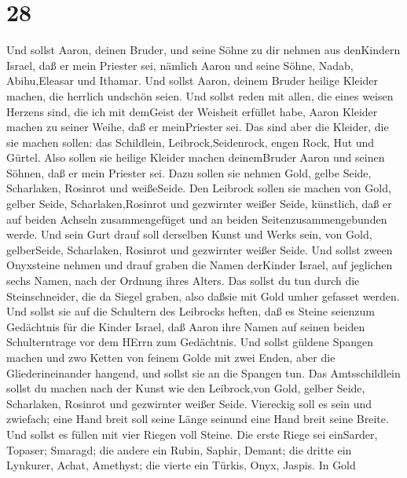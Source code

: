 \hypertarget{section-27}{%
\section{28}\label{section-27}}

 Und sollst Aaron, deinen Bruder, und seine Söhne zu dir
nehmen aus denKindern Israel, daß er mein Priester sei, nämlich Aaron
und seine Söhne, Nadab, Abihu,Eleasar und Ithamar.  Und
sollst Aaron, deinem Bruder heilige Kleider machen, die herrlich
undschön seien.  Und sollst reden mit allen, die eines
weisen Herzens sind, die ich mit demGeist der Weisheit erfüllet habe,
Aaron Kleider machen zu seiner Weihe, daß er meinPriester sei.
 Das sind aber die Kleider, die sie machen sollen: das
Schildlein, Leibrock,Seidenrock, engen Rock, Hut und Gürtel. Also sollen
sie heilige Kleider machen deinemBruder Aaron und seinen Söhnen, daß er
mein Priester sei.  Dazu sollen sie nehmen Gold, gelbe
Seide, Scharlaken, Rosinrot und weißeSeide.  Den Leibrock
sollen sie machen von Gold, gelber Seide, Scharlaken,Rosinrot und
gezwirnter weißer Seide, künstlich,  daß er auf beiden
Achseln zusammengefüget und an beiden Seitenzusammengebunden werde.
 Und sein Gurt drauf soll derselben Kunst und Werks sein,
von Gold, gelberSeide, Scharlaken, Rosinrot und gezwirnter weißer Seide.
 Und sollst zween Onyxsteine nehmen und drauf graben die
Namen derKinder Israel,  auf jeglichen sechs Namen, nach
der Ordnung ihres Alters.  Das sollst du tun durch die
Steinschneider, die da Siegel graben, also daßsie mit Gold umher
gefasset werden.  Und sollst sie auf die Schultern des
Leibrocks heften, daß es Steine seienzum Gedächtnis für die Kinder
Israel, daß Aaron ihre Namen auf seinen beiden Schulterntrage vor dem
HErrn zum Gedächtnis.  Und sollst güldene Spangen machen
 und zwo Ketten von feinem Golde mit zwei Enden, aber die
Gliederineinander hangend, und sollst sie an die Spangen tun.
 Das Amtsschildlein sollst du machen nach der Kunst wie den
Leibrock,von Gold, gelber Seide, Scharlaken, Rosinrot und gezwirnter
weißer Seide.  Viereckig soll es sein und zwiefach; eine
Hand breit soll seine Länge seinund eine Hand breit seine Breite.
 Und sollst es füllen mit vier Riegen voll Steine. Die
erste Riege sei einSarder, Topaser; Smaragd;  die andere
ein Rubin, Saphir, Demant;  die dritte ein Lynkurer, Achat,
Amethyst;  die vierte ein Türkis, Onyx, Jaspis. In Gold
